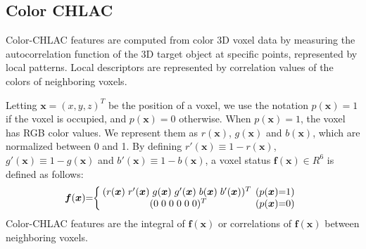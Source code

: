 \documentclass[conference]{sty/IEEEtran}
\begin{document}
\subsection{Color CHLAC}
Color-CHLAC features are computed from color 3D voxel data by measuring 
    the autocorrelation function of the 3D target object at specific points, 
    represented by local patterns.
Local descriptors are represented by correlation values of the colors of neighboring voxels.

Letting $\bm{x}=(x,y,z)^T$ be the position of a voxel, 
    we use the notation $p(\bm{x})=1$ if the voxel is occupied, and $p(\bm{x})=0$ otherwise. 
When $p(\bm{x})=1$, the voxel has RGB color values.
We represent them as $r(\bm{x})$, $g(\bm{x})$ and $b(\bm{x})$, 
    which are normalized between 0 and 1.
By defining $r'(\bm{x}) \equiv 1 - r(\bm{x})$, $g'(\bm{x}) \equiv 1 - g(\bm{x})$ and $b'(\bm{x}) \equiv 1 - b(\bm{x})$, 
    a voxel status $\bm{f}(\bm{x})\in R^6$ is defined as follows:
\begin{eqnarray*}
  \label{eq:voxel}
  \bm{f}({\bm x})\hspace{-1mm}=\hspace{-1mm}\left\{
  \begin{array}{cc}
    \hspace{-1mm}
    (r({\bm x})\hspace{1mm} r'({\bm x}) \hspace{1mm}g({\bm x}) \hspace{1mm}g'({\bm x}) \hspace{1mm}b({\bm x}) \hspace{1mm}b'({\bm x}))^T & \hspace{-2mm}(p({\bm x})\hspace{-1mm}=\hspace{-1mm}1) \\
    (0\hspace{1mm}0\hspace{1mm}0\hspace{1mm}0\hspace{1mm}0\hspace{1mm}0)^T & \hspace{-2mm}(p({\bm x})\hspace{-1mm}=\hspace{-1mm}0)
  \end{array}\right.
\end{eqnarray*}
%
Color-CHLAC features are the integral of $\bm{f}(\bm{x})$ or correlations of $\bm{f}(\bm{x})$ between neighboring voxels.
\end{document}
